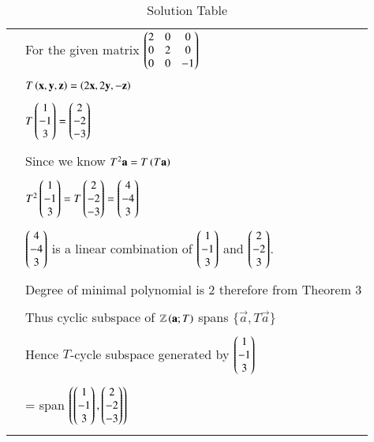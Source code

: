 \documentclass[journal,12pt]{IEEEtran}
\begin{document}
\begin{longtable}{|l|l|}
&For the given matrix  $\begin{pmatrix}2&0&0\\0&2&0\\0&0&-1\end{pmatrix}$\\
&\\
&$T\left(\mathbf{x},\mathbf{y},\mathbf{z}\right)=\left(2\mathbf{x},2\mathbf{y},-\mathbf{z}\right)$\\
&\\
&$T\begin{pmatrix}1\\-1\\3\end{pmatrix}=\begin{pmatrix}2\\-2\\-3\end{pmatrix}$\\
&\\
&Since we know $T^2\mathbf{a}=T\left(T\mathbf{a}\right)$\\
&\\
&$T^2\begin{pmatrix}1\\-1\\3\end{pmatrix}=T\begin{pmatrix}2\\-2\\-3\end{pmatrix}=\begin{pmatrix}4\\-4\\3\end{pmatrix}$\\
&\\
&$\begin{pmatrix}4\\-4\\3\end{pmatrix}$ is a linear combination of $\begin{pmatrix}1\\-1\\3\end{pmatrix}$ and $\begin{pmatrix}2\\-2\\3\end{pmatrix}$.\\
&\\
&Degree of minimal polynomial is 2 therefore from Theorem 3\\
&\\
&Thus cyclic subspace of $\mathbb{Z}\left(\mathbf{a};T\right)$ spans $\{\vec{a} , T\vec{a}\}$\\
&\\
&Hence $T$-cycle subspace generated by $\begin{pmatrix}1\\-1\\3\end{pmatrix}$\\
&\\
&= span $\left(\begin{pmatrix}1\\-1\\3\end{pmatrix},\begin{pmatrix}2\\-2\\-3\end{pmatrix}\right)$ \\

\hline

\caption{Solution Table}
\label{table:2}
\end{longtable}
\end{document}
